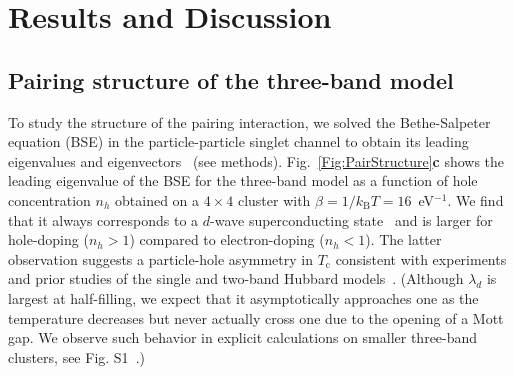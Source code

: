 \documentclass[fleqn,twocolumn,11pt]{wlscirep}
\begin{document}
\section*{Results and Discussion}

\subsection*{Pairing structure of the three-band model}
To study the structure of the pairing interaction, we solved the Bethe-Salpeter equation (BSE) in the particle-particle singlet channel to obtain its leading eigenvalues and  eigenvectors~\cite{supplement, Maier4PRL} (see methods). 
Fig.~\ref{Fig:PairStructure}{\bf c} shows the leading eigenvalue of the BSE for the three-band model as a function of hole concentration $n_h$ obtained on a $4\times 4$ cluster with $\beta=1/k_\mathrm{B}T=16$~eV$^{-1}$. We find that it always corresponds to a $d$-wave superconducting state~\cite{KirtleyReview} and is larger for hole-doping ($n_h>1$) compared to electron-doping ($n_h<1$). The latter observation suggests a particle-hole asymmetry in $T_\mathrm{c}$ consistent with experiments and prior studies of the single and two-band Hubbard models~\cite{Maier3,Macridin}. (Although $\lambda_d$ is largest at half-filling, we expect that it asymptotically approaches one as the temperature decreases but never actually cross one due to the opening of a Mott gap. We observe such behavior in explicit calculations on smaller three-band clusters, see Fig. S1~\cite{supplement}.)
\end{document}
